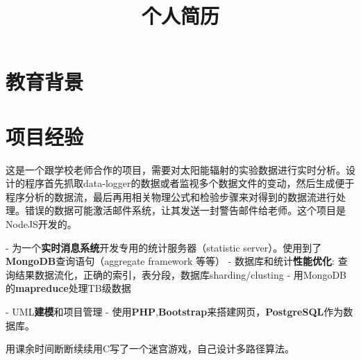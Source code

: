 \documentclass[11pt,a4paper]{moderncv}
\title{\small 个人简历}
\begin{document}
\maketitle

\section{教育背景}


\section{项目经验}

{
这是一个跟学校老师合作的项目，需要对太阳能辐射的实验数据进行实时分析。设计的程序首先抓取data-logger的数据或者监视多个数据文件的变动，然后生成便于程序分析的数据流，最后再用相关物理公式和检验步骤来对得到的数据流进行处理。错误的数据可能激活邮件系统，让其发送一封警告邮件给老师。这个项目是NodeJS开发的。
}

\vspace*{0.2\baselineskip}
{
- 为一个\textbf{实时消息系统}开发专用的统计服务器（statistic server）。使用到了\textbf{MongoDB}查询语句（aggregate framework 等等）\newline
- 数据库和统计\textbf{性能优化}: 查询结果数据流化，正确的索引，表分段，数据库sharding/clusting\newline
- 用MongoDB的\textbf{mapreduce}处理TB级数据
}

\vspace*{0.2\baselineskip}
{
- UML\textbf{建模}和项目管理\newline
- 使用\textbf{PHP},\textbf{Bootstrap}来搭建网页，\textbf{PostgreSQL}作为数据库。
}

\vspace*{0.2\baselineskip}
{用课余时间断断续续用C写了一个迷宫游戏，自己设计多路径算法。}
\end{document}

